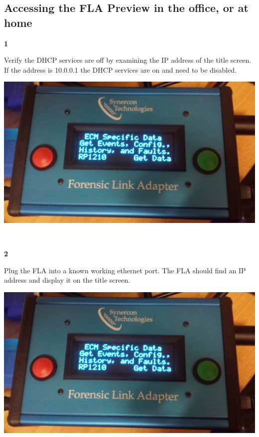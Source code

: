 \documentclass[11pt]{article}
\begin{document}
\subsection{Accessing the FLA Preview in the office, or at home}
\noindent\begin{minipage}{0.3\textwidth}%
\begin{center}
\textbf{1}\\[\baselineskip]
\end{center}
Verify the DHCP services are off by examining the IP address of the title screen. If the address is 10.0.0.1 the DHCP services are on and need to be disabled.
\end{minipage}%
\hfill%
\begin{minipage}{0.6\textwidth}
\includegraphics[width=\linewidth]{../../media/fla_screens/ecm_confirm}
\end{minipage}\\[\baselineskip]
\noindent\begin{minipage}{0.3\textwidth}%
\begin{center}
\textbf{2}\\[\baselineskip]
\end{center}
Plug the FLA into a known working ethernet port. The FLA should find an IP address and display it on the title screen.
\end{minipage}%
\hfill%
\begin{minipage}{0.6\textwidth}
\includegraphics[width=\linewidth]{../../media/fla_screens/ecm_confirm}
\end{minipage}\\[\baselineskip]
\end{document}
